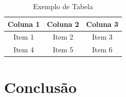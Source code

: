 \documentclass[12pt,a4paper,oneside,brazil]{abntex2}
\begin{document}
\begin{table}[ht]
\centering
\begin{tabular}{|c|c|c|}
\hline
Coluna 1 & Coluna 2 & Coluna 3 \\ \hline
Item 1   & Item 2   & Item 3   \\ \hline
Item 4   & Item 5   & Item 6   \\ \hline
\end{tabular}
\caption{Exemplo de Tabela}
\label{tab:exemplo}
\end{table}

\chapter{Conclusão}
\lipsum[11-12]


\end{document}
